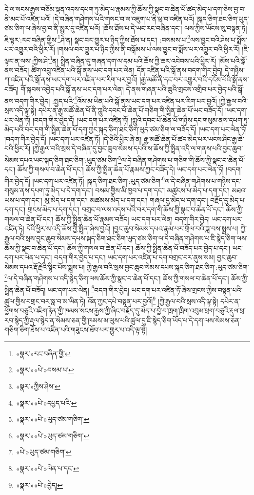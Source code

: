 དེ་ལ་སངས་རྒྱས་བཅོམ་ལྡན་འདས་དཔག་ཏུ་མེད་པ་རྣམས་ཀྱི་ཆོས་ཀྱི་སྣང་བ་ཆེན་པོ་ཚད་མེད་པ་དག་ཅེས་བྱ་བ་ནི་མང་པོ་འཛིན་པའོ། །དེ་བཞིན་གཤེགས་པའི་གསང་བ་ལ་འཇུག་པ་ནི་ཕྲ་བ་འཛིན་པའོ། །སྐད་ཅིག་ཐང་ཅིག་ཡུད་ཙམ་ཅིག་ལ་ཞེས་བྱ་བ་ནི་མྱུར་དུ་འཛིན་པའོ། །ཆོས་ཐོས་པ་དེ་ཡང་རང་བཞིན་དང་། ལས་ཀྱིས་ཡོངས་སུ་བསྟན་ཏེ། ཇི་ལྟར་:རང་བཞིན་གྱིས་\footnote{«སྣར་»རང་བཞིན་གྱི་}ཤེ་ན། སྣང་བར་གྱུར་པ་ཉིད་ཀྱིས་ཐོས་པ་དང་། :བསམས་པ་\footnote{«སྣར་»«པེ་»བསམ་པ་}ལས་བྱུང་བའི་ཤེས་པ་སྨོས་པར་འགྱུར་བའི་ཕྱིར་རོ། །གསལ་བར་གྱུར་པ་ཉིད་ཀྱིས་ནི་བསྒོམས་པ་ལས་བྱུང་བ་སྨོས་པར་འགྱུར་བའི་ཕྱིར་རོ། །ཇི་ལྟར་ན་ལས་:ཀྱིས་ཤེ་\footnote{«སྣར་»ཀྱིས་ཤེས་}ན། སྤྲིན་བཞིན་དུ་གཞན་དག་ལ་དམ་པའི་ཆོས་ཀྱི་ཆར་འབེབས་པའི་ཕྱིར་རོ། །མོས་པའི་སྒོ་ནས་བཟོད། ཚིག་འབྲུ་འཛིན་པའི་སྒོ་ནས་ཡང་དག་པར་ལེན། དོན་འཛིན་པའི་སྒོ་ནས་བདག་གིར་བྱེད། དེ་གཉིས་ཀ་འཛིན་པའི་སྒོ་ནས་ཡང་དག་པར་འཛིན་པར་རིག་པར་བྱའོ། །རྒྱ་མཚོ་ནི་དང་བར་འགྱུར་བའི་དངོས་པོའི་སྒོ་ནས་བཟོད། གོ་སྐབས་འབྱེད་པའི་སྒོ་ནས་ཡང་དག་པར་ལེན། དེ་ནས་གཞན་པའི་ཆུའི་གྲངས་འགྲིབ་པར་བྱེད་པའི་སྒོ་ནས་བདག་གིར་བྱེད། :སྤྱད་པའི་\footnote{«སྣར་»«པེ་»དཔྱད་པའི་}འོས་མ་ཡིན་པའི་སྒོ་ནས་ཡང་དག་པར་འཛིན་པར་རིག་པར་བྱའོ། །ཀྱེ་རྒྱལ་བའི་སྲས་འདི་ལྟ་སྟེ། དཔེར་ན་རྒྱ་མཚོ་ཆེན་པོ་ནི་ཀླུའི་དབང་པོ་ཆེན་པོ་གཅིག་གི་སྤྲིན་ཆེན་པོ་ཡང་བཟོད་དོ། །ཡང་དག་པར་ལེན་ཏོ། །བདག་གིར་བྱེད་དོ། །ཡང་དག་པར་འཛིན་ཏོ། །ཀླུའི་དབང་པོ་ཆེན་པོ་གཉིས་དང་གསུམ་ནས་དཔག་ཏུ་མེད་པའི་བར་དག་གི་སྤྲིན་ཆེན་པོ་དག་ཀྱང་སྐད་ཅིག་ཐང་ཅིག་ཡུད་ཙམ་ཅིག་ལ་བཟོད་དོ། །ཡང་དག་པར་ལེན་ཏོ། །བདག་གིར་བྱེད་དོ། །ཡང་དག་པར་འཛིན་ཏོ། །དེ་ཅིའི་ཕྱིར་ཞེ་ན། རྒྱ་མཚོ་ཆེན་པོ་ཚད་མེད་པར་ཡངས་ཤིང་རྒྱ་ཆེ་བའི་ཕྱིར་རོ། །ཀྱེ་རྒྱལ་བའི་སྲས་དེ་བཞིན་དུ་བྱང་ཆུབ་སེམས་དཔའི་ས་ཆོས་ཀྱི་སྤྲིན་འདི་ལ་གནས་པའི་བྱང་ཆུབ་སེམས་དཔའ་ཡང་སྐད་ཅིག་ཐང་ཅིག་:ཡུད་ཙམ་ཅིག་\footnote{«སྣར་»«པེ་»ཡུད་ཙམ་གཅིག་}ལ་དེ་བཞིན་གཤེགས་པ་གཅིག་གི་ཆོས་ཀྱི་སྣང་བ་ཆེན་པོ་དང་། ཆོས་ཀྱི་གསལ་བ་ཆེན་པོ་དང་། ཆོས་ཀྱི་སྤྲིན་ཆེན་པོ་རྣམས་ཀྱང་བཟོད་དེ། ཡང་དག་པར་ལེན་ཏོ། །བདག་གིར་བྱེད་དོ། །ཡང་དག་པར་འཛིན་ཏོ། །སྐད་ཅིག་ཐང་ཅིག་:ཡུད་ཙམ་ཅིག་\footnote{«སྣར་»«པེ་»ཡུད་ཙམ་གཅིག་}ལ་དེ་བཞིན་གཤེགས་པ་གཉིས་དང་གསུམ་ནས་དཔག་ཏུ་མེད་པ་དེ་དག་དང་། བསམ་གྱིས་མི་ཁྱབ་པ་དག་དང་། མཚུངས་པ་མེད་པ་དག་དང་། མཐའ་ཡས་པ་དག་དང་། མུ་མེད་པ་དག་དང་། མཚམས་མེད་པ་དག་དང་། གཞལ་དུ་མེད་པ་དག་དང་། བརྗོད་དུ་མེད་པ་དག་དང་། གྲངས་མེད་པ་དག་དང་། བགྲང་བ་ལས་འདས་པའི་བར་དག་གི་ཆོས་ཀྱི་སྣང་བ་ཆེན་པོ་དང་། ཆོས་ཀྱི་གསལ་བ་ཆེན་པོ་དང་། ཆོས་ཀྱི་སྤྲིན་ཆེན་པོ་རྣམས་བཟོད། ཡང་དག་པར་ལེན། བདག་གིར་བྱེད། ཡང་དག་པར་འཛིན་ཏེ། དེའི་ཕྱིར་ས་འདི་ཆོས་ཀྱི་སྤྲིན་ཞེས་བྱའོ། །བྱང་ཆུབ་སེམས་དཔའ་རྣམ་པར་གྲོལ་བའི་ཟླ་བས་སྨྲས་པ། ཀྱེ་རྒྱལ་བའི་སྲས་བྱང་ཆུབ་སེམས་དཔས་སྐད་ཅིག་ཐང་ཅིག་ཡུད་ཙམ་ཅིག་ལ་དེ་བཞིན་གཤེགས་པ་ཇི་སྙེད་ཅིག་ལས་ཆོས་ཀྱི་སྣང་བ་ཆེན་པོ་དང་། ཆོས་ཀྱི་གསལ་བ་ཆེན་པོ་དང་། ཆོས་ཀྱི་སྤྲིན་ཆེན་པོ་བཟོད་པར་བྱེད་པ་དང་། ཡང་དག་པར་ལེན་པ་དང་། བདག་གིར་བྱེད་པ་དང་། ཡང་དག་པར་འཛིན་པ་དག་བགྲང་བར་ནུས་སམ། བྱང་ཆུབ་སེམས་དཔའ་རྡོ་རྗེའི་སྙིང་པོས་སྨྲས་པ། ཀྱེ་རྒྱལ་བའི་སྲས་བྱང་ཆུབ་སེམས་དཔས་སྐད་ཅིག་ཐང་ཅིག་:ཡུད་ཙམ་ཅིག་\footnote{«པེ་»ཡུད་ཙམ་གཅིག་}ལ་དེ་བཞིན་གཤེགས་པ་འདི་སྙེད་ཅིག་ལས་ཆོས་ཀྱི་སྣང་བ་ཆེན་པོ་དང་། ཆོས་ཀྱི་གསལ་བ་ཆེན་པོ་དང་། ཆོས་ཀྱི་སྤྲིན་ཆེན་པོ་བཟོད། ཡང་དག་པར་ལེན། \footnote{«སྣར་»«པེ་»ལེན་པ་དང་}བདག་གིར་བྱེད། ཡང་དག་པར་འཛིན་ཏོ་ཞེས་གྲངས་ཀྱིས་བསྟན་པའི་ཚུལ་གྱིས་བགྲང་བར་སླ་བ་མ་ཡིན་ཏེ། འོན་ཀྱང་དཔེ་བསྟན་པར་བྱའོ།\footnote{«སྣར་»«པེ་»བྱེད།} །ཀྱེ་རྒྱལ་བའི་སྲས་འདི་ལྟ་སྟེ། དཔེར་ན་ཕྱོགས་བཅུའི་འཇིག་རྟེན་གྱི་ཁམས་སངས་རྒྱས་ཀྱི་ཞིང་བརྗོད་དུ་མེད་པ་བྱེ་བ་ཁྲག་ཁྲིག་འབུམ་ཕྲག་བཅུའི་རྡུལ་ཕྲ་རབ་སྙེད་ཀྱི་རྡུལ་སྙེད་ན་སེམས་ཅན་གྱི་ཁམས་མ་ལུས་པའི་ཚུལ་དུ་ཇི་སྙེད་ཅིག་ཡོད་པ་དེ་དག་ལས་སེམས་ཅན་གཅིག་ཅིག་ཐོས་པ་འཛིན་པའི་གཟུངས་ཐོབ་པར་གྱུར་པ་འདི་ལྟ་སྟེ། 